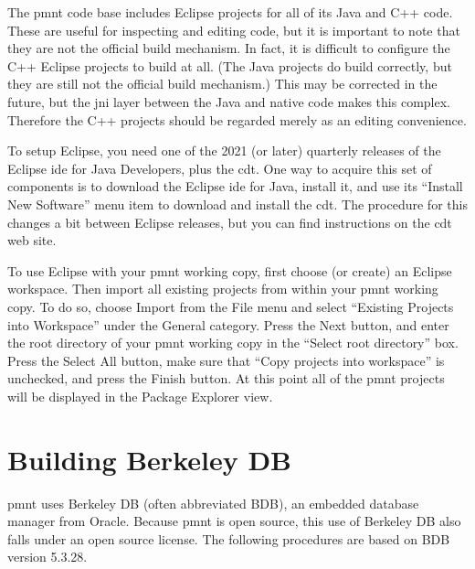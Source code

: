 The \ac{pmnt} code base includes Eclipse projects for all of its Java and C++ code.  These are useful for inspecting and editing code, but it is important to note that they are not the official build mechanism.  In fact, it is difficult to configure the C++ Eclipse projects to build at all.  (The Java projects do build correctly, but they are still not the official build mechanism.)  This may be corrected in the future, but the \ac{jni} layer between the Java and native code makes this complex.  Therefore the C++ projects should be regarded merely as an editing convenience.

To setup Eclipse, you need one of the 2021 (or later) quarterly releases of the Eclipse \ac{ide} for Java Developers, plus the \ac{cdt}.  One way to acquire this set of components is to download the Eclipse \ac{ide} for Java, install it, and use its ``Install New Software'' menu item to download and install the \ac{cdt}.  The procedure for this changes a bit between Eclipse releases, but you can find instructions on the \ac{cdt} web site.

To use Eclipse with your \ac{pmnt} working copy, first choose (or create) an Eclipse workspace.  Then import all existing projects from within your \ac{pmnt} working copy.  To do so, choose Import from the File menu and select ``Existing Projects into Workspace'' under the General category.  Press the Next button, and enter the root directory of your \ac{pmnt} working copy in the ``Select root directory'' box.  Press the Select All button, make sure that ``Copy projects into workspace'' is unchecked, and press the Finish button.  At this point all of the \ac{pmnt} projects will be displayed in the Package Explorer view.

\section{Building Berkeley DB}
\label{sec:BuildingBerkeleyDB}

\ac{pmnt} uses Berkeley DB (often abbreviated BDB), an embedded database manager from Oracle.  Because \ac{pmnt} is open source, this use of Berkeley DB also falls under an open source license.  The following procedures are based on BDB version 5.3.28.


